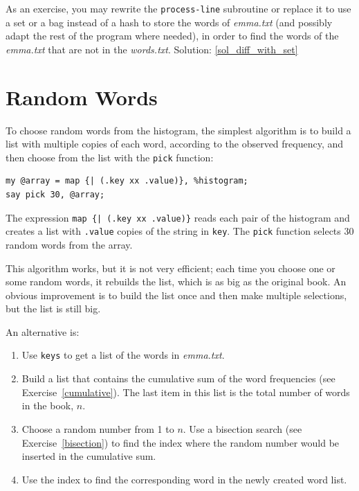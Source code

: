 \label{diff_with_set}
As an exercise, you may rewrite the {\tt process-line} 
subroutine or replace it to use a set or a bag instead of a hash 
to store the words of \emph{emma.txt} (and possibly adapt the rest of 
the program where needed), in order to find the words of the \emph{emma.txt} 
that are not in the \emph{words.txt}.
Solution: \ref{sol_diff_with_set}


\section{Random Words}
\label{randomwords}

To choose random words from the histogram, the simplest algorithm
is to build a list with multiple copies of each word, according
to the observed frequency, and then choose from the list with the 
\verb'pick' function:

\begin{verbatim}
my @array = map {| (.key xx .value)}, %histogram;
say pick 30, @array;
\end{verbatim}
%
The expression \verb'map {| (.key xx .value)}' reads each 
pair of the histogram and creates a list with {\tt .value} 
copies of the string in {\tt key}.  The {\tt pick} function 
selects 30 random words from the array.

This algorithm works, but it is not very efficient; each time you
choose one or some random words, it rebuilds the list, which is 
as big as the original book.  An obvious improvement is to build 
the list once and then make multiple selections, but the list 
is still big.

An alternative is:

\begin{enumerate}

\item Use {\tt keys} to get a list of the words in \emph{emma.txt}.

\item Build a list that contains the cumulative sum of the word
  frequencies (see Exercise~\ref{cumulative}).  The last item
  in this list is the total number of words in the book, $n$.
  
\item Choose a random number from 1 to $n$.  Use a bisection search
  (see Exercise~\ref{bisection}) to find the index where the random
  number would be inserted in the cumulative sum.

\item Use the index to find the corresponding word in the newly 
created word list.

\end{enumerate}


